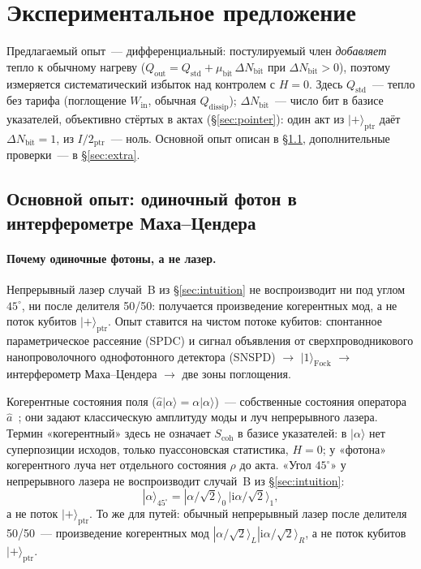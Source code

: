 \documentclass[11pt,a4paper]{article}
\newcommand{\Sref}[1]{\hyperref[#1]{\S\ref{#1}}}
\begin{document}
\section{Экспериментальное предложение}\label{sec:experiment}

Предлагаемый опыт~--- дифференциальный: постулируемый член \emph{добавляет} тепло к обычному нагреву ($Q_{\mathrm{out}} = Q_{\mathrm{std}} + \mu_{\mathrm{bit}}\,\Delta N_{\mathrm{bit}}$ при $\Delta N_{\mathrm{bit}} > 0$), поэтому измеряется систематический избыток над контролем с $H=0$. Здесь $Q_{\mathrm{std}}$~--- тепло без тарифа (поглощение $W_{\mathrm{in}}$, обычная $Q_{\mathrm{dissip}}$); $\Delta N_{\mathrm{bit}}$~--- число бит в базисе указателей, объективно стёртых в актах (\Sref{sec:pointer}): один акт из $|{+}\rangle_{\mathrm{ptr}}$ даёт $\Delta N_{\mathrm{bit}}=1$, из $I/2_{\mathrm{ptr}}$~--- ноль. Основной опыт описан в \Sref{sec:mz}, дополнительные проверки~--- в \Sref{sec:extra}.

\subsection{Основной опыт: одиночный фотон в интерферометре Маха--Цендера}\label{sec:mz}

\paragraph{Почему одиночные фотоны, а не лазер.}
Непрерывный лазер случай~B из \Sref{sec:intuition} не воспроизводит ни под углом $45^\circ$, ни после делителя 50/50: получается произведение когерентных мод, а не поток кубитов $|{+}\rangle_{\mathrm{ptr}}$. Опыт ставится на чистом потоке кубитов: спонтанное параметрическое рассеяние (SPDC) и сигнал объявления от сверхпроводникового нанопроволочного однофотонного детектора (SNSPD) $\to$ $|1\rangle_{\mathrm{Fock}}$ $\to$ интерферометр Маха--Цендера $\to$ две зоны поглощения.

Когерентные состояния поля ($\hat a|\alpha\rangle=\alpha|\alpha\rangle$)~--- собственные состояния оператора $\hat a$~\cite{glauber1963}; они задают классическую амплитуду моды и луч непрерывного лазера. Термин «когерентный» здесь не означает $S_{\mathrm{coh}}$ в базисе указателей: в $|\alpha\rangle$ нет суперпозиции исходов, только пуассоновская статистика, $H=0$; у «фотона» когерентного луча нет отдельного состояния $\rho$ до акта. «Угол $45^\circ$» у непрерывного лазера не воспроизводит случай~B из \Sref{sec:intuition}:
\begin{equation}
|\alpha\rangle_{45^\circ} = |\alpha/\sqrt{2}\rangle_{0}\,|\mathrm{i}\alpha/\sqrt{2}\rangle_{1},
\end{equation}
а не поток $|{+}\rangle_{\mathrm{ptr}}$. То же для путей: обычный непрерывный лазер после делителя 50/50~--- произведение когерентных мод $|\alpha/\sqrt{2}\rangle_L|\mathrm{i}\alpha/\sqrt{2}\rangle_R$, а не поток кубитов $|{+}\rangle_{\mathrm{ptr}}$.
\end{document}
